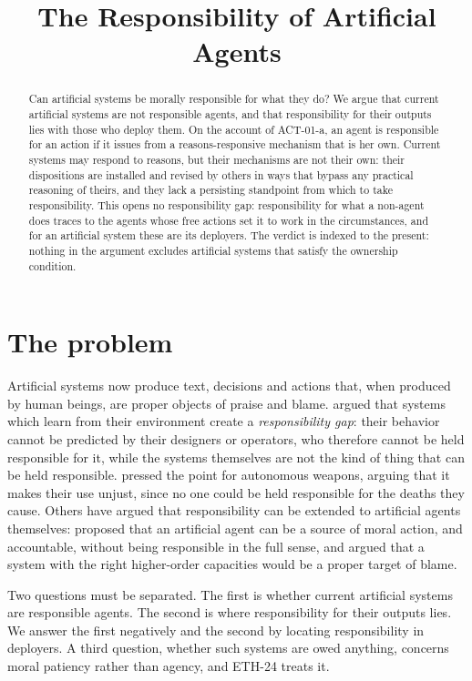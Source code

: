 \documentclass{situationist-preprint}
\title{The Responsibility of Artificial Agents}
\begin{document}
\maketitle

\begin{abstract}
Can artificial systems be morally responsible for what they do? We argue that current artificial systems are not responsible agents, and that responsibility for their outputs lies with those who deploy them. On the account of ACT-01-a, an agent is responsible for an action if it issues from a reasons-responsive mechanism that is her own. Current systems may respond to reasons, but their mechanisms are not their own: their dispositions are installed and revised by others in ways that bypass any practical reasoning of theirs, and they lack a persisting standpoint from which to take responsibility. This opens no responsibility gap: responsibility for what a non-agent does traces to the agents whose free actions set it to work in the circumstances, and for an artificial system these are its deployers. The verdict is indexed to the present: nothing in the argument excludes artificial systems that satisfy the ownership condition.
\end{abstract}

\section{The problem}

Artificial systems now produce text, decisions and actions that, when produced by human beings, are proper objects of praise and blame. \citet{Matthias2004} argued that systems which learn from their environment create a \emph{responsibility gap}: their behavior cannot be predicted by their designers or operators, who therefore cannot be held responsible for it, while the systems themselves are not the kind of thing that can be held responsible. \citet{Sparrow2007} pressed the point for autonomous weapons, arguing that it makes their use unjust, since no one could be held responsible for the deaths they cause. Others have argued that responsibility can be extended to artificial agents themselves: \citet{FloridiSanders2004} proposed that an artificial agent can be a source of moral action, and accountable, without being responsible in the full sense, and \citet{Dennett1997} argued that a system with the right higher-order capacities would be a proper target of blame.

Two questions must be separated. The first is whether current artificial systems are responsible agents. The second is where responsibility for their outputs lies. We answer the first negatively and the second by locating responsibility in deployers. A third question, whether such systems are owed anything, concerns moral patiency rather than agency, and ETH-24 treats it.
\end{document}
